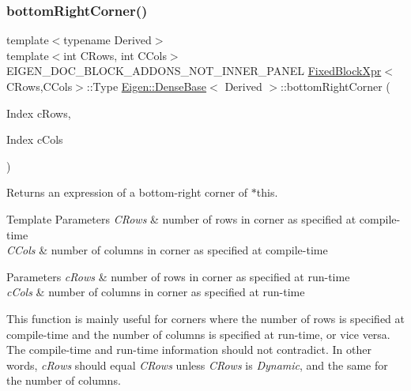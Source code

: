 \subsubsection{\texorpdfstring{bottomRightCorner()}{bottomRightCorner()}\hspace{0.1cm}{\footnotesize\ttfamily [3/3]}}
{\footnotesize\ttfamily template$<$typename Derived$>$ \\
template$<$int C\+Rows, int C\+Cols$>$ \\
E\+I\+G\+E\+N\+\_\+\+D\+O\+C\+\_\+\+B\+L\+O\+C\+K\+\_\+\+A\+D\+D\+O\+N\+S\+\_\+\+N\+O\+T\+\_\+\+I\+N\+N\+E\+R\+\_\+\+P\+A\+N\+EL \mbox{\hyperlink{struct_eigen_1_1_dense_base_1_1_fixed_block_xpr}{Fixed\+Block\+Xpr}}$<$C\+Rows,C\+Cols$>$\+::Type \mbox{\hyperlink{class_eigen_1_1_dense_base}{Eigen\+::\+Dense\+Base}}$<$ Derived $>$\+::bottom\+Right\+Corner (\begin{DoxyParamCaption}\item[{Index}]{c\+Rows,  }\item[{Index}]{c\+Cols }\end{DoxyParamCaption})\hspace{0.3cm}{\ttfamily [inline]}}

\begin{DoxyReturn}{Returns}
an expression of a bottom-\/right corner of $\ast$this.
\end{DoxyReturn}

\begin{DoxyTemplParams}{Template Parameters}
{\em C\+Rows} & number of rows in corner as specified at compile-\/time \\
\hline
{\em C\+Cols} & number of columns in corner as specified at compile-\/time \\
\hline
\end{DoxyTemplParams}

\begin{DoxyParams}{Parameters}
{\em c\+Rows} & number of rows in corner as specified at run-\/time \\
\hline
{\em c\+Cols} & number of columns in corner as specified at run-\/time\\
\hline
\end{DoxyParams}
This function is mainly useful for corners where the number of rows is specified at compile-\/time and the number of columns is specified at run-\/time, or vice versa. The compile-\/time and run-\/time information should not contradict. In other words, {\itshape c\+Rows} should equal {\itshape C\+Rows} unless {\itshape C\+Rows} is {\itshape Dynamic}, and the same for the number of columns.

